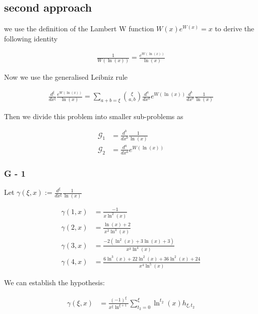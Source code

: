 \section{}

\subsection{second approach}

we use the definition of the Lambert W function 
\(W(x)e^{W(x)}=x\) to derive the following identity

\begin{align}
	     \frac{1}{W(\ln(x))}=\frac{e^{W(\ln(x))}}{\ln(x)}
\end{align}

Now we use the generalised Leibniz rule

\begin{align}
	     \frac{d^{\xi}}{dx^{\xi}}\frac{e^{W(\ln(x))}}{\ln(x)}=
	     \sum_{a+b=\xi}\binom{\xi}{a, b}\frac{d^a}{dx^a}e^{W(\ln(x))}
	     \frac{d^b}{dx^b}\frac{1}{\ln(x)}
\end{align}

Then we divide this problem into smaller sub-problems as

\begin{align}
	     \mathcal{G}_1 &= \frac{d^b}{dx^b}\frac{1}{\ln(x)} \\
	     \mathcal{G}_2 &= \frac{d^a}{dx^a}e^{W(\ln(x))}
\end{align}

\subsubsection{G - 1}

Let \(\gamma(\xi, x) :=\frac{d^\xi}{dx^\xi}\frac{1}{\ln(x)}\)

\begin{align}
	     \gamma(1, x) &= \frac{-1}{x\ln^2(x)} \\
	     \gamma(2, x) &= \frac{\ln(x)+2}{x^2\ln^3(x)} \\
	     \gamma(3, x) &= \frac{-2(\ln^2(x)+3\ln(x)+3)}{x^3\ln^4(x)} \\
	     \gamma(4, x) &= \frac{6\ln^3(x)+22\ln^2(x)+36\ln^2(x)+24}{x^4\ln^5(x)} 
\end{align}

We can establish the hypothesis:

\begin{align}
    \gamma(\xi, x) &= \frac{(-1)^\xi}{x^\xi\ln^{\xi+1}}
    \sum_{t_2=0}^\xi \ln^{t_2}(x)h_{\xi, t_2}
\end{align}

